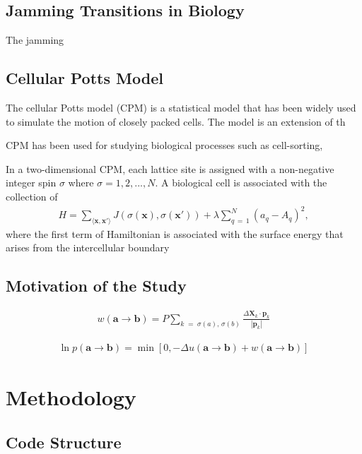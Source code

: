 \documentclass[a4paper,12pt]{article}
\newcommand{\abs}[1]{\left|#1\right|}
\newcommand{\inc}{\Delta}
\begin{document}
\subsection{Jamming Transitions in Biology}

The jamming\cite{bimotility-driven2015}

\subsection{Cellular Potts Model}


The cellular Potts model (CPM) is a statistical model that has been widely used to simulate the motion of closely packed cells. The model is an extension of th

CPM has been used for studying biological processes such as cell-sorting,

In a two-dimensional CPM, each lattice site is assigned with a non-negative integer spin $\sigma$ where $\sigma = 1, 2, ..., N$. A biological cell is associated with the collection of 
\begin{eqnarray}
H = \sum_{\langle{\bm{x}, \bm{x'}\rangle}} J\left(\sigma(\bm{x}), \sigma(\bm{x'})\right) + \lambda \sum_{q\,=\,1}^{N} \left(a_q - A_q\right)^2,
\end{eqnarray}
where the first term of Hamiltonian is associated with the surface energy that arises from the intercellular boundary

\subsection{Motivation of the Study}

\begin{eqnarray}
w (\bm{a} \rightarrow \bm{b}) = P \sum_{k \;=\; \sigma(a),\,\sigma(b)} \frac{\inc \bm{X}_k \cdot \bm{p}_k}{\abs{\bm{p}_k}}
\end{eqnarray}

\begin{eqnarray}
\ln p (\bm{a} \rightarrow \bm{b}) = \min \left[0, -\inc u (\bm{a} \rightarrow \bm{b}) + w (\bm{a} \rightarrow \bm{b}) \right]
\end{eqnarray}

\pagebreak
\section{Methodology}

\subsection{Code Structure}
\end{document}

